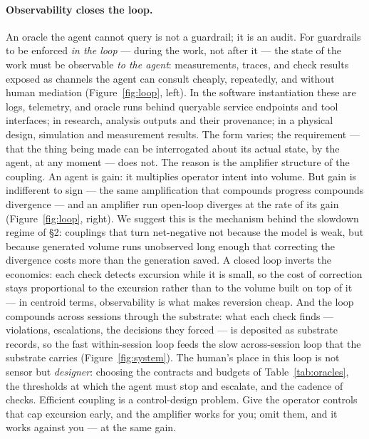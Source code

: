 \documentclass[11pt,a4paper,twocolumn]{article}
\begin{document}
\paragraph{Observability closes the loop.} An oracle the agent
cannot query is not a guardrail; it is an audit. For guardrails
to be enforced \emph{in the loop} --- during the work, not after
it --- the state of the work must be observable \emph{to the
agent}: measurements, traces, and check results exposed as
channels the agent can consult cheaply, repeatedly, and without
human mediation (Figure~\ref{fig:loop}, left). In the software
instantiation these are logs, telemetry, and oracle runs behind
queryable service endpoints and tool interfaces; in research,
analysis outputs and their provenance; in a physical design,
simulation and measurement results. The form varies; the
requirement --- that the thing being made can be interrogated
about its actual state, by the agent, at any moment --- does not.
The reason is the amplifier structure of the coupling. An
agent is gain: it multiplies operator intent into volume. But
gain is indifferent to sign --- the same amplification that
compounds progress compounds divergence --- and an amplifier run
open-loop diverges at the rate of its gain
(Figure~\ref{fig:loop}, right). We suggest this is the mechanism
behind the slowdown regime of \S2: couplings that turn
net-negative not because the model is weak, but because generated
volume runs unobserved long enough that correcting the divergence
costs more than the generation saved. A closed loop inverts the
economics: each check detects excursion while it is small, so the
cost of correction stays proportional to the excursion rather
than to the volume built on top of it --- in centroid terms,
observability is what makes reversion cheap. And the loop
compounds across sessions through the substrate: what each check
finds --- violations, escalations, the decisions they forced ---
is deposited as substrate records, so the fast within-session
loop feeds the slow across-session loop that the substrate
carries (Figure~\ref{fig:system}). The human's place in
this loop is not sensor but \emph{designer}: choosing the
contracts and budgets of Table~\ref{tab:oracles}, the thresholds
at which the agent must stop and escalate, and the cadence of
checks. Efficient coupling is a control-design problem. Give the
operator controls that cap excursion early, and the amplifier
works for you; omit them, and it works against you --- at the
same gain.
\end{document}
